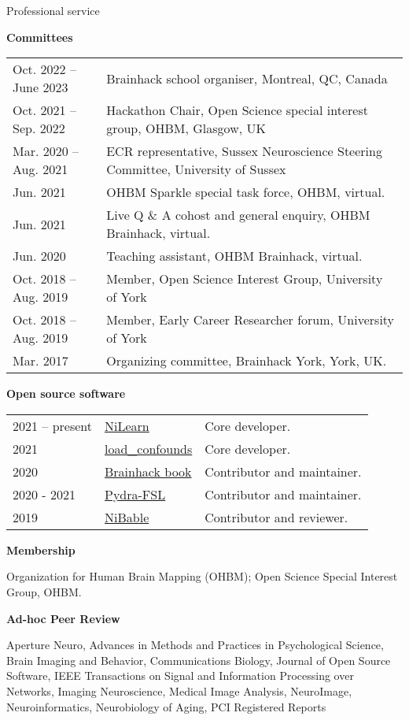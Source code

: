 \documentclass{resume} %
\begin{document}
\begin{rSection}{Professional service}

\textbf{Committees}

\begin{tabular}{@{} l l @{\hspace{6ex}}}
  Oct. 2022 -- June 2023 & Brainhack school organiser, Montreal, QC, Canada \\
  Oct. 2021 -- Sep. 2022 & Hackathon Chair, Open Science special interest group, OHBM, Glasgow, UK \\
  Mar. 2020 -- Aug. 2021 & ECR representative, Sussex Neuroscience Steering Committee, University of Sussex\\
  Jun. 2021 & OHBM Sparkle special task force, OHBM, virtual. \\
  Jun. 2021 & Live Q \& A cohost and general enquiry, OHBM Brainhack, virtual. \\
  Jun. 2020 & Teaching assistant, OHBM Brainhack, virtual. \\
  Oct. 2018 -- Aug. 2019 & Member, Open Science Interest Group, University of York\\
  Oct. 2018 -- Aug. 2019 & Member, Early Career Researcher forum, University of York\\
  Mar. 2017 & Organizing committee, Brainhack York, York, UK.\\
\end{tabular}

\textbf{Open source software}

\begin{tabular}{@{} l l l @{\hspace{6ex}}}
  2021 -- present & \href{https://github.com/nilearn/nilearn}{NiLearn} & Core developer.\\
  2021 & \href{https://github.com/SIMEXP/load_confounds}{load\_confounds} & Core developer.\\
  2020 & \href{https://github.com/brainhackorg/brainhack_jupyter_book}{Brainhack book} & Contributor and maintainer. \\
  2020 - 2021 & \href{https://github.com/nipype/pydra-fsl}{Pydra-FSL} & Contributor and maintainer. \\
  2019 & \href{https://github.com/nipy/nibabel/pull/793}{NiBable} & Contributor and reviewer.\\
\end{tabular}

\textbf{Membership}

Organization for Human Brain Mapping (OHBM); Open Science Special Interest Group, OHBM.

\textbf{Ad-hoc Peer Review}

Aperture Neuro,
Advances in Methods and Practices in Psychological Science,
Brain Imaging and Behavior,
Communications Biology,
Journal of Open Source Software,
IEEE Transactions on Signal and Information Processing over Networks,
Imaging Neuroscience,
Medical Image Analysis,
NeuroImage,
Neuroinformatics,
Neurobiology of Aging,
PCI Registered Reports
\end{rSection}
\end{document}
